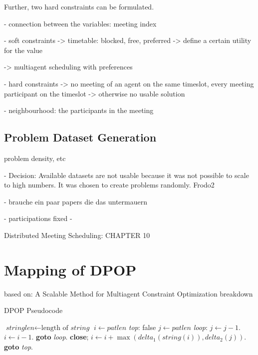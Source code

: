 Further, two hard constraints can be formulated.

- connection between the variables: meeting index

- soft constraints -> timetable: blocked, free, preferred -> define a certain utility for the value

\cite{Franzin} -> multiagent scheduling with preferences

- hard constraints -> no meeting of an agent on the same timeslot, every meeting participant on the timeslot -> otherwise no usable solution

- neighbourhood: the participants in the meeting



\cite{Chapman2011}
\cite{chun, andy 2003}
\cite{mes, martijn 2007}
\cite{BenHassine2007}
\cite{Berger2008}


\subsection{Problem Dataset Generation}

problem density, etc

- Decision: Available datasets are not usable because it was not possible to scale to high numbers. It was chosen to create problems randomly.
Frodo2

- brauche ein paar papers die das untermauern

- participations fixed
- 

Distributed Meeting Scheduling: CHAPTER 10

\section{Mapping of DPOP}

based on: A Scalable Method for Multiagent Constraint Optimization
breakdown
   
    \begin{algorithm}
\caption{DPOP Pseudocode}\label{euclid}
\begin{algorithmic}[1]
\State $\textit{stringlen} \gets \text{length of }\textit{string}$
\State $i \gets \textit{patlen}$
\BState \emph{top}:
 \Return false
\EndIf
\State $j \gets \textit{patlen}$
\BState \emph{loop}:
\State $j \gets j-1$.
\State $i \gets i-1$.
\State \textbf{goto} \emph{loop}.
\State \textbf{close};
\EndIf
\State $i \gets i+\max(\textit{delta}_1(\textit{string}(i)),\textit{delta}_2(j))$.
\State \textbf{goto} \emph{top}.
\EndProcedure
\end{algorithmic}
\end{algorithm}

